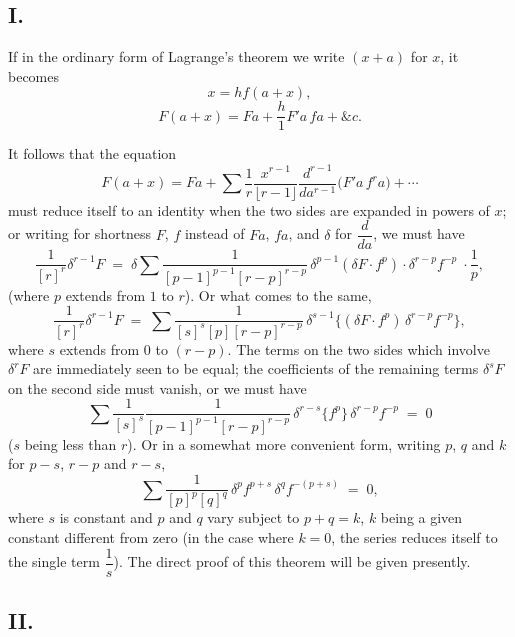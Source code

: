 \documentclass[11pt]{article}
\begin{document}
\subsection*{I.}

If in the ordinary form of Lagrange's theorem we write $(x+a)$ for $x$, it becomes
\[ x = h f(a+x), \]
\begin{equation}
F(a+x) = Fa + \frac{h}{1} F'a\, fa + \&c.
\end{equation}

It follows that the equation
\begin{equation}
F(a+x) = Fa + \sum \frac{1}{r} \frac{x^{r-1}}{\lfloor r-1 \rfloor} \frac{d^{r-1}}{da^{r-1}}\bigl(F'a\, f^r a\bigr) + \cdots
\end{equation}
must reduce itself to an identity when the two sides are expanded in powers of $x$; or writing for shortness $F$, $f$ instead of $Fa$, $fa$, and $\delta$ for $\dfrac{d}{da}$, we must have
\begin{equation}
\frac{1}{[r]^r}\delta^{r-1}F \;=\; \delta \sum \frac{1}{[p-1]^{p-1}[r-p]^{r-p}}\,\delta^{p-1}(\delta F\cdot f^p)\cdot \delta^{r-p}f^{-p}\;\cdot\frac{1}{p},
\end{equation}
(where $p$ extends from $1$ to $r$). Or what comes to the same,
\[ \frac{1}{[r]^r}\delta^{r-1}F \;=\; \sum \frac{1}{[s]^s[p][r-p]^{r-p}}\,\delta^{s-1}\bigl\{(\delta F\cdot f^p)\,\delta^{r-p}f^{-p}\bigr\}, \]
where $s$ extends from $0$ to $(r-p)$. The terms on the two sides which involve $\delta^r F$ are immediately seen to be equal; the coefficients of the remaining terms $\delta^s F$ on the second side must vanish, or we must have
\begin{equation}
\sum \frac{1}{[s]^s}\frac{1}{[p-1]^{p-1}[r-p]^{r-p}}\,\delta^{r-s}\bigl\{f^p\bigr\}\,\delta^{r-p}f^{-p} \;=\; 0
\end{equation}
($s$ being less than $r$). Or in a somewhat more convenient form, writing $p$, $q$ and $k$ for $p-s$, $r-p$ and $r-s$,
\begin{equation}
\sum \frac{1}{[p]^p[q]^q}\,\delta^p f^{p+s}\,\delta^q f^{-(p+s)} \;=\; 0,
\end{equation}
where $s$ is constant and $p$ and $q$ vary subject to $p+q=k$, $k$ being a given constant different from zero (in the case where $k=0$, the series reduces itself to the single term $\dfrac{1}{s}$). The direct proof of this theorem will be given presently.

\subsection*{II.}
\end{document}

